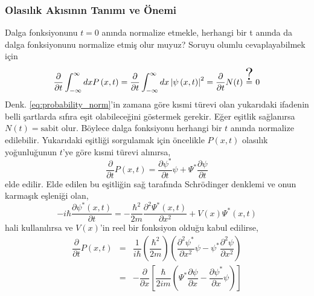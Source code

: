 \documentclass[a4paper,12pt, twoside]{article}
\begin{document}
\subsubsection{Olasılık Akısının Tanımı ve Önemi}


Dalga fonksiyonunu $t=0$ anında normalize etmekle, herhangi bir t anında da dalga fonksiyonunu normalize etmiş olur muyuz? Soruyu olumlu cevaplayabilmek için 
\begin{equation}
\dfrac {\partial }{\partial t} \int ^{\infty }_{-\infty }dxP\left( x,t\right) = \dfrac {\partial }{\partial t} \int ^{\infty }_{-\infty }dx\left| \psi \left( x,t\right) \right| ^{2}= \dfrac {\partial }{\partial t}N(t) \stackrel{\scalebox{2}{?}}{=} 0 
\label{eq:probability_norm_derivative}
\end{equation}
Denk. \ref{eq:probability_norm}'in zamana göre kısmi türevi olan yukarıdaki ifadenin belli şartlarda sıfıra eşit olabileceğini göstermek gerekir. Eğer eşitlik sağlanırsa $N(t) = \text{sabit}$ olur. Böylece dalga fonksiyonu herhangi bir $t$ anında normalize edilebilir. Yukarıdaki eşitliği sorgulamak için öncelikle $P(x,t)$ olasılık yoğunluğunun $t$'ye göre kısmi türevi alınırsa,
\begin{equation}
\dfrac {\partial }{\partial t}P\left( x,t\right) = \dfrac {\partial \psi ^{\ast }}{\partial t}\psi +\Psi ^{\ast }\dfrac {\partial \psi }{\partial t}
\label{eq:probability_derivative_t}
\end{equation}
elde edilir. Elde edilen bu eşitliğin sağ tarafında Schrödinger denklemi ve onun karmaşık eşleniği olan,
\begin{equation}
-i\hbar \dfrac {\partial \psi ^{\ast }\left( x,t\right) }{\partial t}=-\dfrac {\hbar ^{2}}{2m}\dfrac {\partial ^{2}\Psi ^{\ast }\left( x,t\right) }{\partial x^{2}}+V\left( x\right) \Psi ^{\ast }\left( x,t\right)
\label{eq:schrodinger_conjugate}
\end{equation}
hali kullanılırsa ve $V(x)$'in reel bir fonksiyon olduğu kabul edilirse,
\begin{eqnarray}
\dfrac {\partial }{\partial t}P\left( x,t\right) &=&\dfrac {1}{i\hbar }\left( \dfrac {\hbar ^{2}}{2m}\right) \left( \dfrac {\partial ^{2}\psi ^{\ast }}{\partial x^{2}}\psi -\psi ^{\ast }\dfrac {\partial ^{2}\psi }{\partial x^{2}}\right) \\
&=&-\dfrac {\partial }{\partial x}\left[ \dfrac {\hbar }{2im}\left( \Psi ^{\ast }\dfrac {\partial \psi }{\partial x}-\dfrac {\partial \psi ^{\ast }}{\partial x}\psi \right) \right]
\end{eqnarray}
\end{document}
